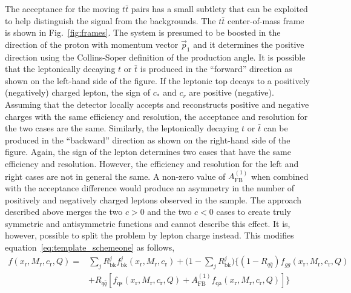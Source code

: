 \documentclass{cmspaperpdf}
\begin{document}
The acceptance for the moving $t\bar t$ pairs has a small subtlety that can be exploited to help distinguish the signal from the backgrounds.  The $t\bar t$ center-of-mass frame is shown in Fig.~\ref{fig:frames}.  The system is presumed to be boosted in the direction of the proton with momentum vector $\vec p_1$ and it determines the positive direction using the Collins-Soper definition of the production angle.  It is possible that the leptonically decaying $t$ or $\bar t$ is produced in the ``forward'' direction as shown on the left-hand side of the figure.  If the leptonic top decays to a positively (negatively) charged lepton, the sign of $c_*$ and $c_r$ are positive (negative).  Assuming that the detector locally accepts and reconstructs positive and negative charges with the same efficiency and resolution, the acceptance and resolution for the two cases are the same.  Similarly, the leptonically decaying $t$ or $\bar t$ can be produced in the ``backward'' direction as shown on the right-hand side of the figure.  Again, the sign of the lepton determines two cases that have the same efficiency and resolution.  However, the efficiency and resolution for the left and right cases are not in general the same.  A non-zero value of $A_\mathrm{FB}^{(1)}$ when combined with the acceptance difference would produce an asymmetry in the number of positively and negatively charged leptons observed in the sample.  The approach described above merges the two $c>0$ and the two $c<0$ cases to create truly symmetric and antisymmetric functions and cannot describe this effect.  It is, however, possible to split the problem by lepton charge instead.  This modifies equation~\ref{eq:template_schemeone} as follows,
\begin{align}
f(x_\mathrm{r},M_\mathrm{r},c_\mathrm{r},Q) =&  \sum_jR^j_\mathrm{bk}f^j_\mathrm{bk}(x_\mathrm{r},M_\mathrm{r},c_\mathrm{r})+\biggl(1-\sum_jR^j_\mathrm{bk}\biggr )\biggl\lbrace \left(1-R_{q\bar q}\right) f_{gg}(x_\mathrm{r},M_\mathrm{r},c_\mathrm{r},Q)\nonumber \\ &+R_{q\bar q}\left[f_\mathrm{qs}(x_\mathrm{r}, M_\mathrm{r}, c_\mathrm{r},Q)+A_\mathrm{FB}^{(1)}f_\mathrm{qa}(x_\mathrm{r}, M_\mathrm{r}, c_\mathrm{r},Q)\right]\biggr\rbrace
\label{eq:template_schemetwo}
\end{align}
\end{document}
